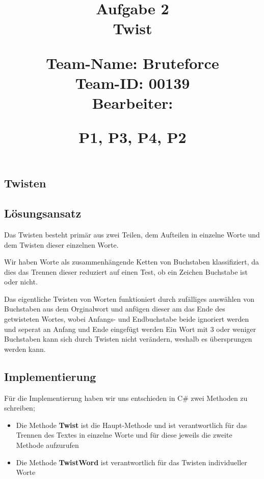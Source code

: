 \documentclass{article}
\begin{document}
\title{
{\Huge Aufgabe 2\\Twist}\\
\vspace{.5cm}
\begin{large}
Team-Name: Bruteforce\\
Team-ID: 00139\\
Bearbeiter:\\ 
\end{large}
\begin{normalsize}
P1,
P3,
P4,
P2
\end{normalsize}
}
\author{}
\date{}
\maketitle
\vspace{5cm}
\tableofcontents
\newpage
\begin{flushleft}

\section{Twisten}

\subsection{Lösungsansatz}
Das Twisten besteht primär aus zwei Teilen, dem Aufteilen in einzelne Worte und dem Twisten dieser einzelnen Worte.

Wir haben Worte als zusammenhängende Ketten von Buchstaben klassifiziert, da dies das Trennen dieser reduziert auf einen Test, ob ein Zeichen Buchstabe ist oder nicht.

Das eigentliche Twisten von Worten funktioniert durch zufälliges auswählen von Buchstaben aus dem Orginalwort und anfügen dieser am das Ende des getwisteten Wortes, wobei Anfangs- und Endbuchstabe beide ignoriert werden und seperat an Anfang und Ende eingefügt werden
Ein Wort mit 3 oder weniger Buchstaben kann sich durch Twisten nicht verändern, weshalb es übersprungen werden kann.


\subsection{Implementierung}
Für die Implementierung haben wir uns entschieden in C\# zwei Methoden zu schreiben;
\begin{itemize}
\item Die Methode \textbf{Twist} ist die Haupt-Methode und ist verantwortlich für das Trennen des Textes in einzelne Worte und für diese jeweils die zweite Methode aufzurufen
\item Die Methode \textbf{TwistWord} ist verantwortlich für das Twisten individueller Worte
\end{itemize}


\end{flushleft}
\end{document}
